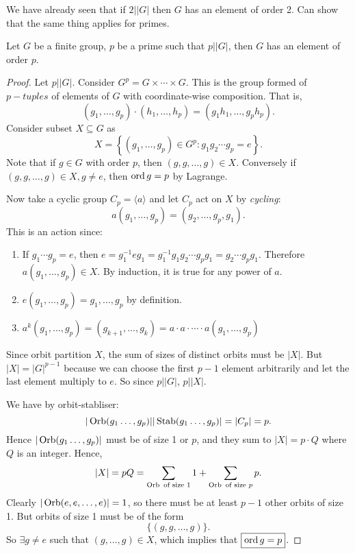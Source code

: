 \documentclass[a4paper]{article}
\begin{document}
      We have already seen that if $2||G|$ then $G$ has an element of order 2. Can show that the same thing applies for primes.

      \begin{theorem}[Cauchy]\label{thm:Cauchy}
          Let $G$ be a finite group, $p$ be a prime such that $p||G|$, then $G$ has an element of order $p$. 
      \end{theorem}
      \begin{proof}
          Let $p||G|$. Consider $ G^p = G\times \cdots \times G $. This is the group formed of $p-tuples$ of elements of $G$ with coordinate-wise composition. That is,
          \[
              (g_1,\dots,g_p)\cdot (h_1,\dots,h_p)=(g_1h_1,\dots,g_ph_p)
          .\]
          Consider subset $ X \subseteq G $ as 
          \[
              X = \left\{ (g_1,\dots,g_p)\in G^p: g_1g_2\cdots g_p = e\right\}
          .\]
          Note that if $g\in G$ with order $p$, then $ (g,g,\dots,g)\in X $. Conversely if $ (g,g,\dots,g)\in X, g\neq e $, then $ \operatorname{ord} g=p $ by Lagrange.

          Now take a cyclic group $C_p=\langle a \rangle $ and let $C_p$ act on $X$ by \textit{cycling}:
          \[
              a(g_1,\dots,g_p)=(g_2,\dots, g_p,g_1)
          .\] 
          This is an action since:
          \begin{enumerate}[(1)]
              \item If $ g_1\cdots g_p=e $, then $ e=g_1^{-1}eg_1=g_1^{-1}g_1g_2\cdots g_p g_1=g_2\cdots g_pg_1 $. Therefore $ a(g_1,\dots,g_p) \in X$. By induction, it is true for any power of $a$.
              \item $ e(g_1,\dots,g_p)=g_1,\dots,g_p $ by definition.
              \item $ a^k(g_1,\dots,g_p)=(g_{k+1},\dots,g_k)=a\cdot a\cdot \cdots \cdot a(g_1,\dots,g_p) $
          \end{enumerate}
          Since orbit partition $X$, the sum of sizes of distinct orbits must be $|X|$. But $|X|=|G|^{p-1}$ because we can choose the first $p-1$ element arbitrarily and let the last element multiply to $e$. So since $ p||G| $, $ p||X| $.

          We have by orbit-stabliser:
          \[
              |\operatorname{Orb}(g_1\dots,g_p)||\operatorname{Stab}(g_1\dots,g_p)|=|C_p|=p
          .\]
          Hence $|\operatorname{Orb}(g_1\dots,g_p)|$ must be of size 1 or $p$, and they sum to $|X|=p\cdot Q$ where $Q$ is an integer. Hence,
          \[
              |X|=pQ=\sum_{\operatorname{Orb} \text{ of size 1}} 1 + \sum_{\operatorname{Orb}\text{ of size }p} p
          .\]
          Clearly $ |\operatorname{Orb}(e,e,\dots,e)|=1 $, so there must be at least $p-1$ other orbits of size 1. But orbits of size 1 must be of the form
          \[
              \{(g,g,\dots,g)\}
          .\]
          So $ \exists g\neq e $ such that $ (g,\dots,g) \in X$, which implies that $ \boxed{\operatorname{ord} g = p }$.
      \end{proof}
\end{document}
